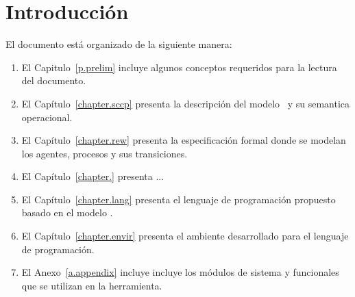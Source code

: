 
\chapter{Introducci\'on}
\label{cha.intro}



El documento est\'a organizado de la siguiente manera:
\begin{enumerate}
\item El Capitulo~\ref{p.prelim} incluye algunos conceptos requeridos para la lectura del documento.
\item El Cap\'itulo~\ref{chapter.sccp} presenta la descripci\'on del modelo \SCCP \ y su semantica operacional.
\item El Cap\'itulo~\ref{chapter.rew} presenta la especificaci\'on formal donde se modelan los agentes, procesos y sus transiciones.
\item El Cap\'itulo~\ref{chapter.} presenta ...
\item El Cap\'itulo~\ref{chapter.lang} presenta el lenguaje de programaci\'on propuesto basado en el modelo \SCCP.
\item El Cap\'itulo~\ref{chapter.envir} presenta el ambiente desarrollado para el lenguaje de programaci\'on.
\item El Anexo~\ref{a.appendix} incluye incluye los m\'odulos de sistema y funcionales que se utilizan en la herramienta.
\end{enumerate}
